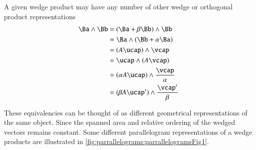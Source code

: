 A given wedge product may have any number of other wedge or orthogonal product representations
\begin{equation}\label{eqn:wedgeProductArea:1940}
\begin{aligned}
\Ba \wedge \Bb
&= (\Ba + \beta \Bb ) \wedge \Bb \\
&= \Ba \wedge ( \Bb + \alpha \Ba ) \\
&= (A \ucap) \wedge \vcap \\
&= \ucap \wedge (A \vcap) \\
&= (\alpha A \ucap) \wedge \frac{\vcap}{\alpha} \\
&= (\beta A \ucap') \wedge \frac{\vcap'}{\beta} \\
\end{aligned}
\end{equation}

These equivalencies can be thought of as different geometrical representations of the same object. Since the spanned area and relative ordering of the wedged vectors remains constant.
Some different parallelogram representations of a wedge products are illustrated in \cref{fig:parrallelograms:parrallelogramsFig1}.

